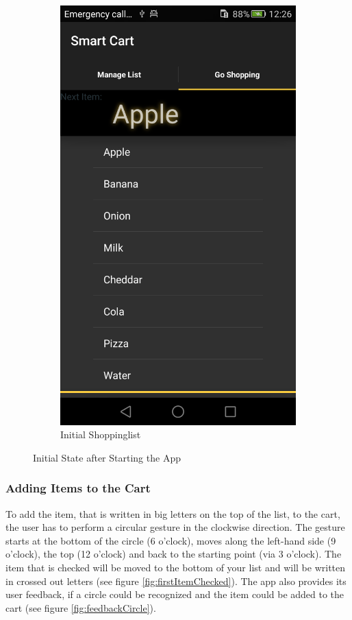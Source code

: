 \begin{figure}[h]
\begin{subfigure}{0.475\textwidth}
\includegraphics[height= 0.3\textheight]{res/usermanual/initialShoppinglist.png}
\caption{Initial Shoppinglist}
\label{fig:initial}
\end{subfigure}
\caption{Initial State after Starting the App}
\label{fig:initialState}
\end{figure}

\subsubsection{Adding Items to the Cart}
To add the item, that is written in big letters on the top of the list, to the
cart, the user has to perform a circular gesture in the clockwise
direction.
The gesture starts at the bottom of the circle (6 o'clock), moves along the
left-hand side (9 o'clock), the top (12 o'clock) and back to the starting point
(via 3 o'clock). The item that is checked will be moved to the bottom of your list and will be written in
crossed out letters (see figure \ref{fig:firstItemChecked}). The app also
provides its user feedback, if a circle could be recognized and the item could
be added to the cart (see figure \ref{fig:feedbackCircle}).

